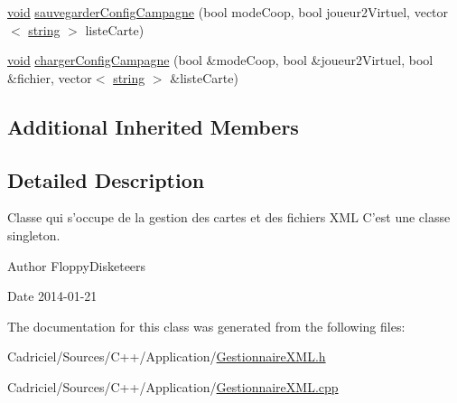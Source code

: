 \begin{DoxyCompactItemize}
\item 
\hyperlink{wglew_8h_aeea6e3dfae3acf232096f57d2d57f084}{void} \hyperlink{group__inf2990_gaf25915bc26ca653ace2a0b4df3a4d808}{sauvegarder\-Config\-Campagne} (bool mode\-Coop, bool joueur2\-Virtuel, vector$<$ \hyperlink{glew_8h_ae84541b4f3d8e1ea24ec0f466a8c568b}{string} $>$ liste\-Carte)
\item 
\hyperlink{wglew_8h_aeea6e3dfae3acf232096f57d2d57f084}{void} \hyperlink{group__inf2990_ga2020824a2c8ca40060649cd759f728f5}{charger\-Config\-Campagne} (bool \&mode\-Coop, bool \&joueur2\-Virtuel, bool \&fichier, vector$<$ \hyperlink{glew_8h_ae84541b4f3d8e1ea24ec0f466a8c568b}{string} $>$ \&liste\-Carte)
\end{DoxyCompactItemize}
\subsection*{Additional Inherited Members}


\subsection{Detailed Description}
Classe qui s'occupe de la gestion des cartes et des fichiers X\-M\-L C'est une classe singleton. 

\begin{DoxyAuthor}{Author}
Floppy\-Disketeers 
\end{DoxyAuthor}
\begin{DoxyDate}{Date}
2014-\/01-\/21 
\end{DoxyDate}


The documentation for this class was generated from the following files\-:\begin{DoxyCompactItemize}
\item 
Cadriciel/\-Sources/\-C++/\-Application/\hyperlink{_gestionnaire_x_m_l_8h}{Gestionnaire\-X\-M\-L.\-h}\item 
Cadriciel/\-Sources/\-C++/\-Application/\hyperlink{_gestionnaire_x_m_l_8cpp}{Gestionnaire\-X\-M\-L.\-cpp}\end{DoxyCompactItemize}
